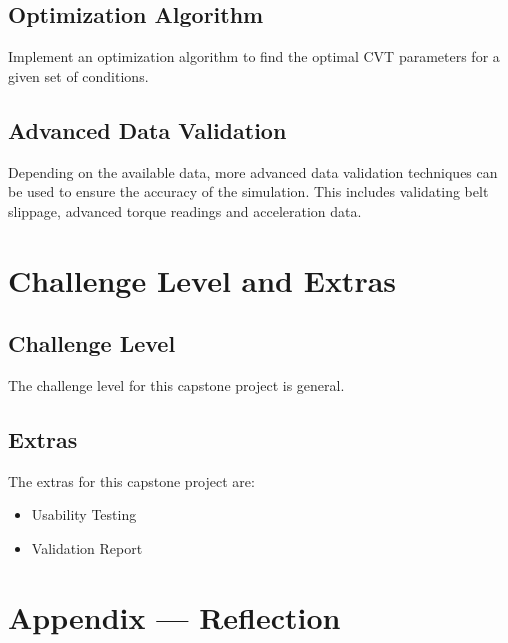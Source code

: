 \documentclass{article}
\begin{document}
\subsection{Optimization Algorithm}
Implement an optimization algorithm to find the optimal CVT parameters for a given set of 
conditions.

\subsection{Advanced Data Validation}
Depending on the available data, more advanced data validation techniques can be used to 
ensure the accuracy of the simulation. This includes validating belt slippage, advanced torque readings and 
acceleration data.

\section{Challenge Level and Extras}

\subsection{Challenge Level}

The challenge level for this capstone project is general.

\subsection{Extras}
The extras for this capstone project are:
\begin{itemize}
    \item Usability Testing
    \item Validation Report
\end{itemize}


\newpage{}

\section*{Appendix --- Reflection}


\end{document}
